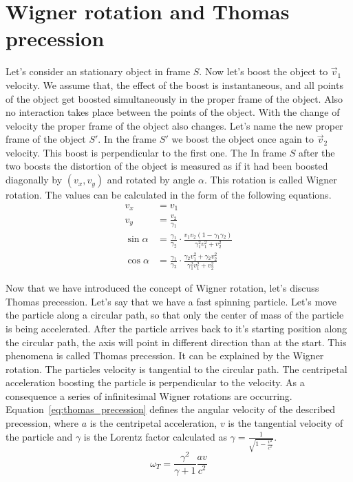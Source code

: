 \documentclass{egpubl}
\begin{document}
\section{Wigner rotation and Thomas precession}
\label{sec:wigner_rotation}
Let's consider an stationary object in frame $S$. Now let's boost the object to $\vec{v}_1$ velocity. We assume that, the effect of the boost is instantaneous, and all points of the object get boosted simultaneously in the proper frame of the object. Also no interaction takes place between the points of the object. With the change of velocity the proper frame of the object also changes. Let's name the new proper frame of the object $S'$. In the frame $S'$ we boost the object once again to $\vec{v}_2$ velocity. This boost is perpendicular to the first one. The 
In frame $S$ after the two boosts the distortion of the object is measured as if it had been boosted diagonally by $(v_x, v_y)$ and rotated by angle $\alpha$. This rotation is called Wigner rotation. The values can be calculated in the form of the following equations.
\begin{align}
v_x &= v_1 \label{eq:wigner_rotation_1}\\
v_y &= \frac{v_2}{\gamma{}_1} \label{eq:wigner_rotation_2}\\
\sin{\alpha} &= \frac{\gamma{}_1}{\gamma{}_2}\cdot\frac{v_1v_2(1-\gamma{}_1\gamma{}_2)}{\gamma{}_1^2v_1^2+v_2^2} \label{eq:wigner_rotation_3}\\
\cos{\alpha} &= \frac{\gamma{}_1}{\gamma{}_2}\cdot\frac{\gamma{}_2v_1^2+\gamma{}_2v_2^2}{\gamma{}_1^2v_1^2+v_2^2} \label{eq:wigner_rotation_4}
\end{align}

Now that we have introduced the concept of Wigner rotation, let's discuss Thomas precession. Let's say that we have a fast spinning particle. Let's move the particle along a circular path, so that only the center of mass of the particle is being accelerated. After the particle arrives back to it's starting position along the circular path, the axis will point in different direction than at the start.
This phenomena is called Thomas precession. It can be explained by the Wigner rotation. The particles velocity is tangential to the circular path. The centripetal acceleration boosting the particle is perpendicular to the velocity. As a consequence a series of infinitesimal Wigner rotations are occurring.
Equation~\ref{eq:thomas_precession} defines the angular velocity of the described precession, where $a$ is the centripetal acceleration, $v$ is the tangential velocity of the particle and $\gamma$ is the Lorentz factor calculated as $\gamma = \frac{1}{\sqrt{1-\frac{v^2}{c^2}}}$.
\begin{equation}
\omega{}_T=\frac{\gamma{}^2}{\gamma + 1}\frac{av}{c^2}
\label{eq:thomas_precession}
\end{equation}
\end{document}

